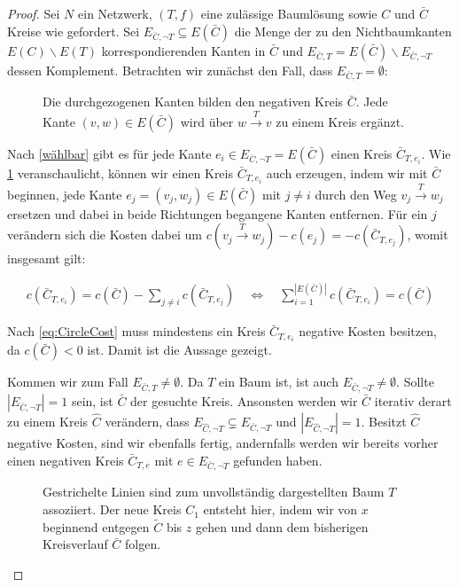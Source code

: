 \begin{proof}Sei $N$ ein Netzwerk, $(T,f)$ eine zulässige Baumlösung sowie $C$ und $\bar{C}$ Kreise wie gefordert. Sei $E_{\bar{C},\neg T}\subseteq E(\bar{C})$ die Menge der zu den Nichtbaumkanten $E(C)\backslash E(T)$ korrespondierenden Kanten in $\bar{C}$ und $E_{\bar{C},T}=E(\bar{C})\backslash E_{\bar{C},\neg T}$ dessen Komplement. Betrachten wir zunächst den Fall, dass $E_{\bar{C},T}=\emptyset$:

\begin{figure}[!ht]\centering
	
	\caption{Die durchgezogenen Kanten bilden den negativen Kreis $\bar{C}$. Jede Kante $(v,w)\in E(\bar{C})$ wird über $w\xrightarrow{T}v$ zu einem Kreis ergänzt.}
	\label{fig:NTC}
\end{figure}

Nach \cref{wählbar} gibt es für jede Kante $e_i\in E_{\bar{C},\neg T}=E(\bar{C})$ einen Kreis $\bar{C}_{T,e_i}$. Wie \cref{fig:NTC} veranschaulicht, können wir einen Kreis $\bar{C}_{T,e_i}$ auch erzeugen, indem wir mit $\bar{C}$ beginnen, jede Kante $e_j=(v_j,w_j)\in E(\bar{C})$ mit $j\neq i$ durch den Weg $v_j\xrightarrow{T}w_j$ ersetzen und dabei in beide Richtungen begangene Kanten entfernen. Für ein $j$ verändern sich die Kosten dabei um $c(v_j\xrightarrow{T}w_j)-c(e_j)=-c(\bar{C}_{T,e_j})$, womit insgesamt gilt:

\begin{align}
c(\bar{C}_{T,e_i})=c(\bar{C})-\sum_{j\neq i} c(\bar{C}_{T,e_j})
\quad\Leftrightarrow\quad\sum_{i=1}^{|E(\bar{C})|} c(\bar{C}_{T,e_i})=c(\bar{C})\label{eq:CircleCost}
\end{align}

Nach \cref{eq:CircleCost} muss mindestens ein Kreis $\bar{C}_{T,e_i}$ negative Kosten besitzen, da $c(\bar{C})<0$ ist. Damit ist die Aussage gezeigt.

Kommen wir zum Fall $E_{\bar{C},T}\neq\emptyset$. Da $T$ ein Baum ist, ist auch $E_{\bar{C},\neg T}\neq\emptyset$. Sollte $|E_{\bar{C},\neg T}|=1$ sein, ist $\bar{C}$ der gesuchte Kreis. Ansonsten werden wir $\bar{C}$ iterativ derart zu einem Kreis $\hat{C}$ verändern, dass $E_{\hat{C},\neg T}\subsetneq E_{\bar{C},\neg T}$ und $|E_{\hat{C},\neg T}|=1$. Besitzt $\hat{C}$ negative Kosten, sind wir ebenfalls fertig, andernfalls werden wir bereits vorher einen negativen Kreis $\bar{C}_{T,e}$ mit $e\in E_{\bar{C},\neg T}$ gefunden haben.

\begin{figure}[!ht]\centering
	
	\caption{Gestrichelte Linien sind zum unvollständig dargestellten Baum $T$ assoziiert. Der neue Kreis $C_1$ entsteht hier, indem wir von $x$ beginnend entgegen $\tilde{C}$ bis $z$ gehen und dann dem bisherigen Kreisverlauf $\bar{C}$ folgen.}
	\label{fig:TC}
\end{figure}


\end{proof}
